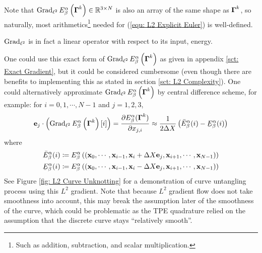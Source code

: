 \documentclass[../dissertation.tex]{subfiles}
\begin{document}
Note that $\operatorname{Grad}_{\ell^2} E_{\beta}^\alpha \left( \boldsymbol{\Gamma}^k \right) \in \mathbb{R}^{3 \times N}$ is also an array of the same shape as $\boldsymbol{\Gamma}^k$,
so naturally, most arithmetics\footnote{Such as addition, subtraction, and scalar multiplication.} needed for (\ref{equ: L2 Explicit Euler}) is well-defined.
\begin{remark}
    $\operatorname{Grad}_{\ell^2}$ is in fact a linear operator with respect to its input, energy.
\end{remark}

One could use this exact form of $\operatorname{Grad}_{\ell^2} E_{\beta}^{\alpha} \left( \boldsymbol{\Gamma}^k \right)$ as given in appendix \ref{sct: Exact Gradient}, but it could be considered cumbersome (even though there are benefits to implementing this as stated in section \ref{sct: L2 Complexity}).
One could alternatively approximate $\operatorname{Grad}_{\ell^2} E_{\beta}^{\alpha} \left( \boldsymbol{\Gamma}^k \right)$ by central difference scheme, for example:
for $i=0,1,\cdots,N-1$ and $j = 1,2,3$,
\begin{equation}
    \ebf_j \cdot \left( \Grad_{\ell^2} E_{\beta}^{\alpha} \left( \Gammabf^k \right) [i] \right)
    =
    \frac{\partial E_{\beta}^{\alpha} (\Gammabf^k)}{\partial x_{j,i}}
    \approx
    \frac{1}{2 \Delta X} \left( 
        \bar{E}_{\beta}^{\alpha} (i)
        -
        \underaccent{\bar} E_{\beta}^{\alpha} (i)
    \right)
\end{equation}
where
\begin{align*}
    \bar{E}_{\beta}^{\alpha} (i) &\coloneqq E_{\beta}^{\alpha} \left( \left( \xbf_0, \cdots, \xbf_{i-1}, \xbf_i + \Delta X \ebf_{j}, \xbf_{i+1}, \cdots, \xbf_{N-1}\right) \right) \\
    \underaccent{\bar}{E}_{\beta}^{\alpha} (i) &\coloneqq E_{\beta}^{\alpha} \left( \left( \xbf_0, \cdots, \xbf_{i-1}, \xbf_i - \Delta X \ebf_{j}, \xbf_{i+1}, \cdots, \xbf_{N-1}\right) \right)
\end{align*}
See Figure \ref{fig: L2 Curve Unknotting} for a demonstration of curve untangling process using this $L^2$ gradient.
Note that because $L^2$ gradient flow does not take smoothness into account, this may break the assumption later of the smoothness of the curve,
which could be problematic as the TPE quadrature relied on the assumption that the discrete curve stays ``relatively smooth''.
\end{document}
